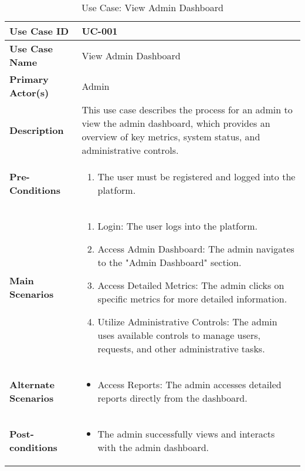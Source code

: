 \begin{table}[!ht]
    \centering
    \renewcommand{\arraystretch}{1.3} %
    \begin{tabularx}{\textwidth}{|l|X|}
        \hline
        \textbf{Use Case ID} & UC-001 \\
        \hline
        \textbf{Use Case Name} & View Admin Dashboard \\
        \hline
        \textbf{Primary Actor(s)} & Admin \\
        \hline
        \textbf{Description} &  This use case describes the process for an admin to view the admin dashboard, which provides an overview of key metrics, system status, and administrative controls.\\
        \hline
        \textbf{Pre-Conditions} & 
        \begin{enumerate}[label=\arabic*.,itemsep=0pt]
            \item The user must be registered and logged into the platform.
        \end{enumerate} \\
        \hline
        \textbf{Main Scenarios} & 
        \begin{enumerate}[label=\arabic*.,itemsep=0pt]
            \item Login: The user logs into the platform.
            \item Access Admin Dashboard: The admin navigates to the "Admin Dashboard" section.
            \item Access Detailed Metrics: The admin clicks on specific metrics for more detailed information.
            \item Utilize Administrative Controls: The admin uses available controls to manage users, requests, and other administrative tasks.
        \end{enumerate} \\
        
        \hline
        \textbf{Alternate Scenarios} & 
        \begin{itemize}[label=--,itemsep=0pt]
            \item Access Reports: The admin accesses detailed reports directly from the dashboard.
        \end{itemize} \\
        \hline
        \textbf{Post-conditions} & 
        \begin{itemize}[label=--,itemsep=0pt]
            \item The admin successfully views and interacts with the admin dashboard.
        \end{itemize} \\
        \hline
    \end{tabularx}
    \caption{Use Case: View Admin Dashboard}
    \label{tab:use-case-register}
\end{table}


